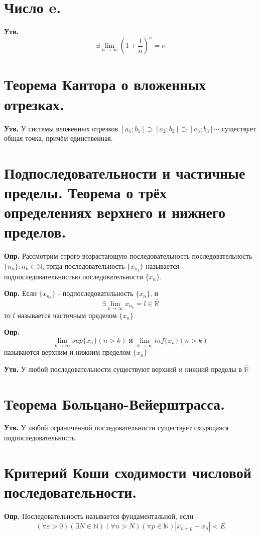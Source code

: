 \documentclass[a4paper,12pt]{article}
\begin{document}
\begin{flushleft}
\section{Число e.}
	
	\textbf{Утв.} $$\exists \lim_{n \to \infty} (1 + \dfrac{1}{n})^n = e$$

\section{Теорема Кантора о вложенных отрезках.}

	\textbf{Утв.} У системы вложенных отрезков $[a_1;b_1] \supset [a_2; b_2] \supset [a_3; b_3] \cdots$ существует общая точка, причём единственная. 
	
	\section{Подпоследовательности и частичные пределы. Теорема о трёх определениях верхнего и нижнего пределов.}

	\textbf{Опр.} Рассмотрим строго возрастающую последовательность последовательность $\{n_k\}: n_k \in \mathbb{N}$, тогда последовательность $\{x_{n_k}\}$ называется подпоследовательностью последовательности $\{x_n\}$.
	
	\textbf{Опр.} Если $\{x_{n_k}\}$ - подпоследовательность $\{x_n\}$, и $$\exists \lim_{k \to \infty} x_{n_k} = l \in \bar{\mathbb{R}}$$ то $l$ называется частичным пределом $\{x_n\}$.

	\textbf{Опр.} $$\lim_{k \to \infty} sup \{x_n\} (n >k) \text{ и } \lim_{k \to 
\infty} inf \{x_n\} (n > k)$$ называются верхним и нижним пределом $\{x_n\}$

	\textbf{Утв.} У любой последовательности существуют верхний и нижний пределы в $\bar{\mathbb{R}}$
\section{Теорема Больцано-Вейерштрасса.}

	\textbf{Утв.} У любой ограниченной последовательности существует сходящаяся подпоследовательность.
	
\section{Критерий Коши сходимости числовой последовательности.}

	\textbf{Опр.} Последовательность называется фундаментальной, если $$(\forall \varepsilon > 0) (\exists N \in \mathbb{N}) (\forall n > N) (\forall p \in \mathbb{N}) |x_{n + p} - x_n| < E$$


\end{flushleft}
\end{document}
